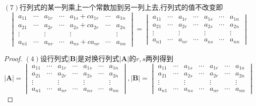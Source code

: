 {    $(7)$行列式的某一列乘上一个常数加到另一列上去,行列式的值不改变即\[
        \begin{vmatrix}
            a_{11} & \cdots & a_{1r} & \cdots & a_{1s}+ca_{1r} & \cdots & a_{1n} \\
            a_{21} & \cdots & a_{2r} & \cdots & a_{2s}+ca_{2r} & \cdots & a_{2n} \\
            \vdots &        & \vdots &        & \vdots         &        & \vdots \\
            a_{n1} & \cdots & a_{nr} & \cdots & a_{ns}+ca_{nr} & \cdots & a_{nn}
        \end{vmatrix}=
        \begin{vmatrix}
            a_{11} & \cdots & a_{1r} & \cdots & a_{1s} & \cdots & a_{1n} \\
            a_{21} & \cdots & a_{2r} & \cdots & a_{2s} & \cdots & a_{2n} \\
            \vdots &        & \vdots &        & \vdots &        & \vdots \\
            a_{n1} & \cdots & a_{nr} & \cdots & a_{ns} & \cdots & a_{nn}
        \end{vmatrix}
    \]\begin{proof}
        $(4)$设行列式$\left|\bm{B}\right|$是对换行列式$\left|\bm{A}\right|$的$r,s$两列得到
        \[
            \left|\bm{A}\right|=\begin{vmatrix}
                a_{11} & \cdots & a_{1r} & \cdots & a_{1s} & \cdots & a_{1n} \\
                a_{21} & \cdots & a_{2r} & \cdots & a_{2s} & \cdots & a_{2n} \\
                \vdots &        & \vdots &        & \vdots &        & \vdots \\
                a_{n1} & \cdots & a_{nr} & \cdots & a_{ns} & \cdots & a_{nn}
            \end{vmatrix},\left|\bm{B}\right|=\begin{vmatrix}
                a_{11} & \cdots & a_{1s} & \cdots & a_{1r} & \cdots & a_{1n} \\
                a_{21} & \cdots & a_{2s} & \cdots & a_{2r} & \cdots & a_{2n} \\
                \vdots &        & \vdots &        & \vdots &        & \vdots \\
                a_{n1} & \cdots & a_{ns} & \cdots & a_{nr} & \cdots & a_{nn}
            \end{vmatrix}
        \]


\end{proof}}
